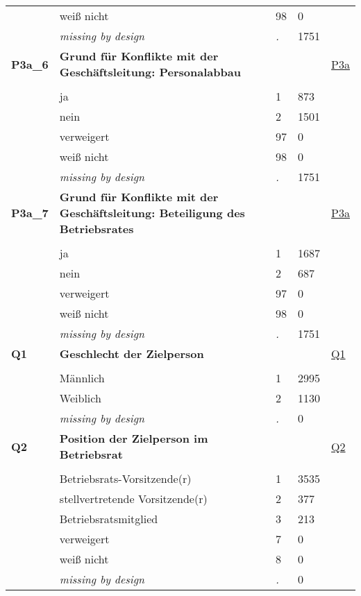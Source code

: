 \begin{longtable}{| L{2.65cm} | L{8cm} | C{1.5cm} | R{1.25cm} | C{2.25cm}  |}
   & weiß nicht & 98 & 0 &  \\ 
   & \textit{missing by design} & \textit{.} & 1751 &  \\ 
   \midrule
\textbf{P3a\_6}\label{var:P3a:6} & \textbf{Grund für Konflikte mit der Geschäftsleitung: Personalabbau} &  &  & \hyperref[P3a]{P3a} \\ 
   &  &  &  &  \\ 
   & ja & 1 & 873 &  \\ 
   & nein & 2 & 1501 &  \\ 
   & verweigert & 97 & 0 &  \\ 
   & weiß nicht & 98 & 0 &  \\ 
   & \textit{missing by design} & \textit{.} & 1751 &  \\ 
   \midrule
\textbf{P3a\_7}\label{var:P3a:7} & \textbf{Grund für Konflikte mit der Geschäftsleitung: Beteiligung des Betriebsrates} &  &  & \hyperref[P3a]{P3a} \\ 
   &  &  &  &  \\ 
   & ja & 1 & 1687 &  \\ 
   & nein & 2 & 687 &  \\ 
   & verweigert & 97 & 0 &  \\ 
   & weiß nicht & 98 & 0 &  \\ 
   & \textit{missing by design} & \textit{.} & 1751 &  \\ 
   \midrule
\textbf{Q1}\label{var:Q1} & \textbf{Geschlecht der Zielperson} &  &  & \hyperref[Q1]{Q1} \\ 
   &  &  &  &  \\ 
   & Männlich & 1 & 2995 &  \\ 
   & Weiblich & 2 & 1130 &  \\ 
   & \textit{missing by design} & \textit{.} & 0 &  \\ 
   \midrule
\textbf{Q2}\label{var:Q2} & \textbf{Position der Zielperson im Betriebsrat} &  &  & \hyperref[Q2]{Q2} \\ 
   &  &  &  &  \\ 
   & Betriebsrats-Vorsitzende(r) & 1 & 3535 &  \\ 
   & stellvertretende Vorsitzende(r) & 2 & 377 &  \\ 
   & Betriebsratsmitglied & 3 & 213 &  \\ 
   & verweigert & 7 & 0 &  \\ 
   & weiß nicht & 8 & 0 &  \\ 
   & \textit{missing by design} & \textit{.} & 0 &  \\ 

\end{longtable}
